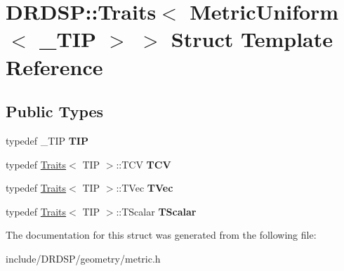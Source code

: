 \hypertarget{struct_d_r_d_s_p_1_1_traits_3_01_metric_uniform_3_01___t_i_p_01_4_01_4}{\section{D\-R\-D\-S\-P\-:\-:Traits$<$ Metric\-Uniform$<$ \-\_\-\-T\-I\-P $>$ $>$ Struct Template Reference}
\label{struct_d_r_d_s_p_1_1_traits_3_01_metric_uniform_3_01___t_i_p_01_4_01_4}
}
\subsection*{Public Types}
\begin{DoxyCompactItemize}
\item 
\hypertarget{struct_d_r_d_s_p_1_1_traits_3_01_metric_uniform_3_01___t_i_p_01_4_01_4_a2e0cc0577541aa569740718f52f9902e}{typedef \-\_\-\-T\-I\-P {\bfseries T\-I\-P}}\label{struct_d_r_d_s_p_1_1_traits_3_01_metric_uniform_3_01___t_i_p_01_4_01_4_a2e0cc0577541aa569740718f52f9902e}

\item 
\hypertarget{struct_d_r_d_s_p_1_1_traits_3_01_metric_uniform_3_01___t_i_p_01_4_01_4_a5cd7d42a3d2518fb97d0c1afe74e5941}{typedef \hyperlink{struct_d_r_d_s_p_1_1_traits}{Traits}$<$ T\-I\-P $>$\-::T\-C\-V {\bfseries T\-C\-V}}\label{struct_d_r_d_s_p_1_1_traits_3_01_metric_uniform_3_01___t_i_p_01_4_01_4_a5cd7d42a3d2518fb97d0c1afe74e5941}

\item 
\hypertarget{struct_d_r_d_s_p_1_1_traits_3_01_metric_uniform_3_01___t_i_p_01_4_01_4_afba860f2dd7a97e53162db743b4acebd}{typedef \hyperlink{struct_d_r_d_s_p_1_1_traits}{Traits}$<$ T\-I\-P $>$\-::T\-Vec {\bfseries T\-Vec}}\label{struct_d_r_d_s_p_1_1_traits_3_01_metric_uniform_3_01___t_i_p_01_4_01_4_afba860f2dd7a97e53162db743b4acebd}

\item 
\hypertarget{struct_d_r_d_s_p_1_1_traits_3_01_metric_uniform_3_01___t_i_p_01_4_01_4_a392deed657c6716f92e17e4d541a6826}{typedef \hyperlink{struct_d_r_d_s_p_1_1_traits}{Traits}$<$ T\-I\-P $>$\-::T\-Scalar {\bfseries T\-Scalar}}\label{struct_d_r_d_s_p_1_1_traits_3_01_metric_uniform_3_01___t_i_p_01_4_01_4_a392deed657c6716f92e17e4d541a6826}

\end{DoxyCompactItemize}


The documentation for this struct was generated from the following file\-:\begin{DoxyCompactItemize}
\item 
include/\-D\-R\-D\-S\-P/geometry/metric.\-h\end{DoxyCompactItemize}

